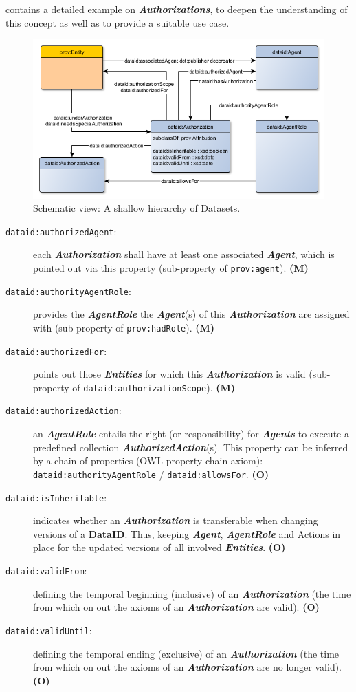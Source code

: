 \documentclass[a4paper,english,twoside,BCOR1.5cm,headsepline,DIV12,appendixprefix,final,12pt]{scrbook}
\newcommand{\dataid}{{\ttfamily\bfseries DataID}\xspace}
\newcommand{\prop}[1]{{{\texttt{#1}}}}
\newcommand{\important}[1]{\textbf{\textit{#1}}}
\begin{document}
 contains a detailed example on \important{Authorizations}, to deepen the understanding of this concept as well as to provide a suitable use case.

\begin{figure}[!htbp]
\centering
  \includegraphics[width=\textwidth]{images/ClassAuthorization.png}
  \caption{Schematic view: A shallow hierarchy of Datasets.}
  \label{fig:example}
\end{figure}

\begin{description}
\item[\prop{dataid:authorizedAgent}:] each \important{Authorization} shall have at least one associated \important{Agent}, which is pointed out via this property (sub-property of \prop{prov:agent}). \textbf{(M)}
\item[\prop{dataid:authorityAgentRole}:] provides the \important{AgentRole} the \important{Agent}(s) of this \important{Authorization} are assigned with (sub-property of \prop{prov:hadRole}). \textbf{(M)}
\item[\prop{dataid:authorizedFor}:] points out those \important{Entities} for which this \important{Authorization} is valid (sub-property of \prop{dataid:authorizationScope}). \textbf{(M)}
\item[\prop{dataid:authorizedAction}:] an \important{AgentRole} entails the right (or responsibility) for \important{Agents} to execute a predefined collection \important{AuthorizedAction}(s). This property can be inferred by a chain of properties (OWL property chain axiom): \prop{dataid:authorityAgentRole} / \prop{dataid:allowsFor}. \textbf{(O)}
\item[\prop{dataid:isInheritable}:] indicates whether an \important{Authorization} is transferable when changing versions of a \dataid. Thus, keeping \important{Agent}, \important{AgentRole} and Actions in place for the updated versions of all involved \important{Entities}. \textbf{(O)}
\item[\prop{dataid:validFrom}:] defining the temporal beginning (inclusive) of an \important{Authorization} (the time from which on out the axioms of an \important{Authorization} are valid). \textbf{(O)}
\item[\prop{dataid:validUntil}:] defining the temporal ending (exclusive) of an \important{Authorization} (the time from which on out the axioms of an \important{Authorization} are no longer valid). \textbf{(O)}
\end{description}
\end{document}
